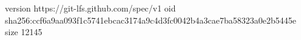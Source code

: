 version https://git-lfs.github.com/spec/v1
oid sha256:ccf6a9aa093f1c5741ebcac3174a9c4d3fc0042b4a3cae7ba58323a0e2b5445e
size 12145
